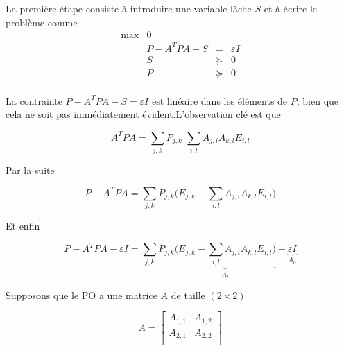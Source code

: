 La première étape consiste à introduire une variable lâche $S$ et à écrire le problème comme  
\begin{equation}
\begin{array}{rrcl}
\max  & 0  & & \\
     & P- A^{T} PA - S &=& \varepsilon I \\
      & S       & \succeq & 0 \\
       & P       & \succeq & 0 \\
\end{array}
\end{equation}

 La contrainte $P- A^{T} PA - S = \varepsilon I$ est linéaire dans les éléments de $P$, bien que cela ne soit pas immédiatement évident.L’observation clé est que  

 \begin{equation}
 A^{T}PA=\underset{ j,k } \sum P_{j,k} \; \underset{i,l} \sum A_{j,i}A_{k,l} E_{i,l}
 \end{equation}  
 
 Par la suite 
 
  \begin{equation}
P- A^{T}PA=\underset{ j,k } \sum P_{j,k} \Big( E_{j,k}- \underset{i,l} \sum A_{j,i}A_{k,l} E_{i,l} \Big)
 \end{equation}  
 
 Et enfin 
 
 
   \begin{equation}
P- A^{T}PA-\varepsilon I=\underset{ j,k } \sum P_{j,k} \underbrace{\Big( E_{j,k}- \underset{i,l} \sum A_{j,i}A_{k,l} E_{i,l} \Big)}_{A_{i}} -\underbrace{\varepsilon I}_{A_{0}} 
 \end{equation}  
% 
% 
 
 
 \vspace*{.5cm}
 
 Supposons que le PO a une matrice $A$ de taille $(2\times2)$ 
 
 \begin{equation}
A=\left[
\begin{array}{rrrrrrr}
 A_{1,1} & A_{1,2}    \\ 
 A_{2,1} & A_{2,2}   \\ 
    
\end{array}
\right]
\end{equation}


